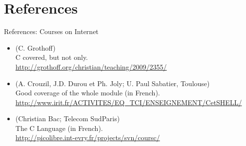 \section{References}
\begin{frame}{References: Courses on Internet}
    \begin{itemize}
    \item {} (C. Grothoff)\\
         {\small
      C covered, but not only.\\
      \url{http://grothoff.org/christian/teaching/2009/2355/}} 
      
    \item {} (A. Crouzil, J.D. Durou et Ph. Joly;
      U. Paul Sabatier, Toulouse)\\
      {\small 
        Good coverage of the whole module (in French).\\
        \url{http://www.irit.fr/ACTIVITES/EQ_TCI/ENSEIGNEMENT/CetSHELL/}}

    \item {} (Christian Bac; Telecom SudParis)\\
      {\small
        The C Language (in French).\\
        \url{http://picolibre.int-evry.fr/projects/svn/coursc/}}
    \end{itemize}
\end{frame}

